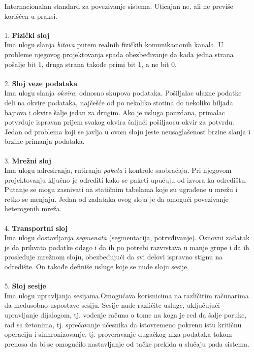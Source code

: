 \documentclass{article} %
\begin{document}
Internacionalan standard za povezivanje sistema. Uticajan ne, ali ne previše korišćen u praksi.
\\\\
1. \textbf{Fizički sloj}\\
Ima ulogu slanja \textit{bitova} putem realnih fizičkih komunikacionih kanala. U probleme njegovog projektovanja spada obezbeđivanje da kada jedna strana pošalje bit 1, druga strana takođe primi bit 1, a ne bit 0.\\\\
2. \textbf{Sloj veze podataka}\\
Ima ulogu slanja \textit{okvira}, odnosno skupova podataka. Pošiljalac ulazne podatke deli na okvire podataka, najčešće od po nekoliko stotina do nekoliko hiljada bajtova i okvire šalje jedan za drugim. Ako je usluga pouzdana, primalac potvrđuje ispravan prijem svakog okvira šaljući pošiljaocu okvir za potvrdu.
Jedan od problema koji se javlja u ovom sloju jeste neusaglašenost brzine slanja i brzine primanja podataka.\\\\
3. \textbf{Mrežni sloj}\\
Ima ulogu adresiranja, rutiranja \textit{paketa} i kontrole saobraćaja. Pri njegovom projektovanju ključno je odrediti kako se paketi upućuju od izvora ka odredištu. Putanje se mogu zasnivati na statičnim tabelama koje su ugrađene u mrežu i retko se menjaju. Jedan od zadataka ovog sloja je da omogući povezivanje heterogenih mreža.\\\\
4. \textbf{Transportni sloj}\\
Ima ulogu dostavljanja \textit{segmenata} (segmentacija, potrvđivanje). Osnovni zadatak je da prihvata podatke odzgo i da ih po potrebi razvrstava u manje grupe i da ih prosleđuje mrežnom sloju, obezbeđujući da svi delovi ispravno stignu na odredište. On takođe definiše usluge koje se nude sloju sesije.\\\\
5. \textbf{Sloj sesije}\\
Ima ulogu upravljanja sesijama.Omogućava korisnicima na različitim računarima da međusobno uspostave sesiju. Sesije nude različite usluge, uključujući upravljanje dijalogom, tj. vođenje računa o tome na koga je red da šalje poruke, rad sa žetonima, tj. sprečavanje učesnika da istovremeno pokrenu istu kritičnu operaciju i sinhronizovanje, tj. proveravanje dugačkog niza podataka tokom prenosa da bi se omogućilo nastavljanje od tačke prekida u slučaju pada sistema.\\\\
\end{document}
